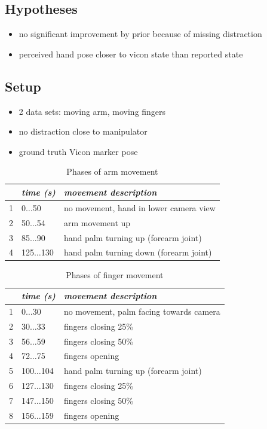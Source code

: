 \subsection{Hypotheses}



\begin{itemize}
\item no significant improvement by prior because of missing distraction
\item perceived hand pose closer to vicon state than reported state
\end{itemize}


\subsection{Setup}



\begin{itemize}
\item 2 data sets: moving arm, moving fingers
\item no distraction close to manipulator
\item ground truth Vicon marker pose
\end{itemize}

\begin{table}
\centering
\begin{tabular}{|c|l|l|}
\hline
 & \emph{time (s)} & \emph{movement description} \\
\hline
1 & 0$\dots$50 & no movement, hand in lower camera view \\
\hline
2 & 50$\dots$54 & arm movement up \\
\hline
3 & 85$\dots$90 & hand palm turning up (forearm joint) \\
\hline
4 & 125$\dots$130 & hand palm turning down (forearm joint) \\
\hline
\end{tabular}
\caption{Phases of arm movement}
\label{tab:vic_arm_movement_phases}
\end{table}

\begin{table}
\centering
\begin{tabular}{|c|l|l|}
\hline
 & \emph{time (s)} & \emph{movement description} \\
\hline
1 & 0$\dots$30 & no movement, palm facing towards camera \\
\hline
2 & 30$\dots$33 & fingers closing 25\% \\
\hline
3 & 56$\dots$59 & fingers closing 50\% \\
\hline
4 & 72$\dots$75 & fingers opening \\
\hline
5 & 100$\dots$104 & hand palm turning up (forearm joint) \\
\hline
6 & 127$\dots$130 & fingers closing 25\% \\
\hline
7 & 147$\dots$150 & fingers closing 50\% \\
\hline
8 & 156$\dots$159 & fingers opening \\
\hline
\end{tabular}
\caption{Phases of finger movement}
\label{tab:vic_finger_movement_phases}
\end{table}


